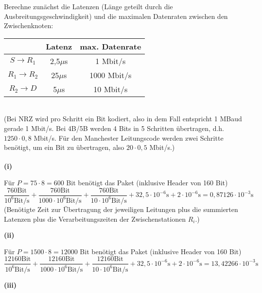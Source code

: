 \documentclass{../exercisesheet}
\begin{document}
\begin{exercise}{5}
\begin{subexercise}
Berechne zunächst die Latenzen (Länge geteilt durch die Ausbreitungsgeschwindigkeit) und die maximalen Datenraten zwischen den Zwischenknoten:\\
\begin{table}[h]
\centering
\begin{tabular}{c|c|c}
 & Latenz & max. Datenrate \\ \hline
$S\rightarrow R_1$      & 2,5$\mu$s & 1 Mbit/s \\ \hline
$R_1 \rightarrow R_2$ & 25$\mu$s & 1000 Mbit/s \\ \hline
$R_2 \rightarrow D$     & 5$\mu$s & 10 Mbit/s
\end{tabular}
\end{table}\\
(Bei NRZ wird pro Schritt ein Bit kodiert, also in dem Fall  entspricht 1 MBaud gerade 1 Mbit/s. Bei 4B/5B werden 4 Bits in 5 Schritten übertragen, d.h. $1250 \cdot 0,8$ Mbit/s. Für den
Manchester Leitungscode werden zwei Schritte benötigt, um ein Bit zu übertragen, also $20 \cdot 0,5$ Mbit/s.)\\ \ \\
\textbf{(i)}
\begin{adjustwidth}{2em}{0em}\vspace{-\baselineskip}
Für $P=75 \cdot 8=600$ Bit benötigt das Paket (inklusive Header von 160 Bit)
\[
\frac{760 \text{Bit}}{10^6 \text{Bit/s}} + \frac{760 \text{Bit}}{1000 \cdot 10^6 \text{Bit/s}} + \frac{760 \text{Bit}}{10 \cdot 10^6 \text{Bit/s}} + 32,5 \cdot 10^{-6}\text{s} + 
2 \cdot 10^{-6}\text{s} = 0,87126 \cdot 10^{-3}\text{s}
\]
(Benötigte Zeit zur Übertragung der jeweiligen Leitungen plus die summierten Latenzen plus die Verarbeitungszeiten der Zwischenstationen $R_i$.)
\end{adjustwidth}
\textbf{(ii)}
\begin{adjustwidth}{2em}{0em}\vspace{-\baselineskip}
Für $P=1500 \cdot 8=12000$ Bit benötigt das Paket (inklusive Header von 160 Bit)
\[
\frac{12160 \text{Bit}}{10^6 \text{Bit/s}} + \frac{12160 \text{Bit}}{1000 \cdot 10^6 \text{Bit/s}} + \frac{12160 \text{Bit}}{10 \cdot 10^6 \text{Bit/s}} + 32,5 \cdot 10^{-6}\text{s} + 
2 \cdot 10^{-6}\text{s} = 13,42266 \cdot 10^{-3}\text{s}
\]
\end{adjustwidth}
\textbf{(iii)}
\begin{adjustwidth}{2em}{0em}\vspace{-\baselineskip}

\end{adjustwidth}
\end{subexercise}
\end{exercise}
\end{document}

